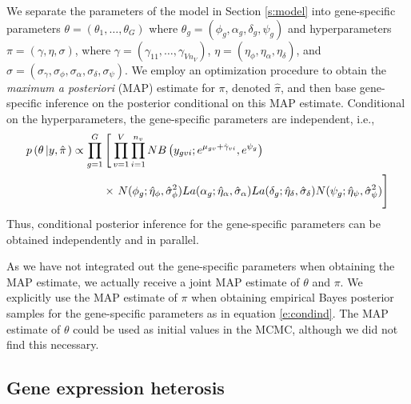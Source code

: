 \documentclass[useAMS,usenatbib,referee]{biom}
\begin{document}
We separate the parameters of the model in Section \ref{s:model} into gene-specific parameters $\theta = (\theta_1,\ldots,\theta_G)$ where $\theta_g = (\phi_g,\alpha_g,\delta_g,\psi_g)$ and hyperparameters $\pi = (\gamma, \eta, \sigma)$, where $\gamma = (\gamma_{11},\ldots,\gamma_{Vn_V})$, $\eta=(\eta_\phi,\eta_\alpha,\eta_\delta)$, and $\sigma=(\sigma_\gamma,\sigma_\phi,\sigma_\alpha,\sigma_\delta,\sigma_\psi)$. We employ an optimization procedure to obtain the \emph{maximum a posteriori} (MAP) estimate for $\pi$, denoted $\hat{\pi}$, and then base gene-specific inference on the posterior conditional on this MAP estimate. Conditional on the hyperparameters, the gene-specific parameters are independent, i.e., 
\begin{equation}
\begin{split}
p\left(\theta\left|y,\hat{\pi}\right.\right) 
\propto \prod_{g=1}^G & \left[ \,\prod_{v=1}^V \prod_{i=1}^{n_v} NB\left(y_{gvi};e^{\mu_{gv}+\hat{\gamma}_{vi}},e^{\psi_g}\right)  \right. \\
&\times 
\left. \vphantom{\prod_{v=1}^V}
N(\phi_g;\hat{\eta}_\phi, \hat{\sigma}_\phi^2)
La(\alpha_g;\hat{\eta}_\alpha, \hat{\sigma}_\alpha)
La(\delta_g;\hat{\eta}_\delta, \hat{\sigma}_\delta)
N(\psi_g;\hat{\eta}_\psi, \hat{\sigma}_\psi^2) 
\right]
\label{e:condind}
\end{split}
\end{equation}
Thus, conditional posterior inference for the gene-specific parameters can be obtained independently and in parallel.

As we have not integrated out the gene-specific parameters when obtaining the MAP estimate, we actually receive a joint MAP estimate of $\theta$ and $\pi$. We explicitly use the MAP estimate of $\pi$ when obtaining empirical Bayes posterior samples for the gene-specific parameters as in equation \eqref{e:condind}. The MAP estimate of $\theta$ could be used as initial values in the MCMC, although we did not find this necessary.

\subsection{Gene expression heterosis}
\label{s:gene_heterosis}
\end{document}
